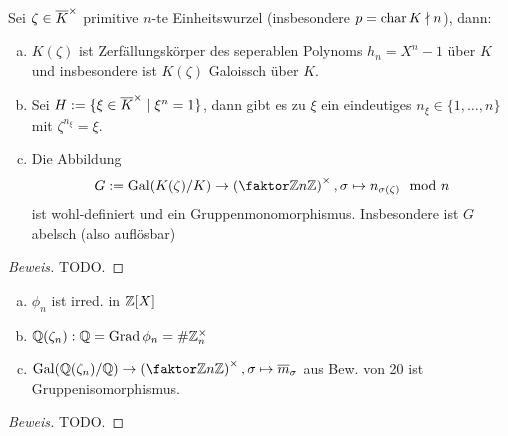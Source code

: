 \documentclass[a4paper]{report}
\begin{document}
\begin{prop}
  Sei $\zeta \in \overline K ^\times $ primitive $n$-te Einheitswurzel (insbesondere $p = \operatorname{char} K \nmid n$), dann:
  \begin{enumerate}[(a)]
    \item $K(\zeta)$ ist Zerfällungskörper des seperablen Polynoms $h_{n} = X^{n} - 1$ über $K$ und insbesondere ist $K(\zeta)$ Galoissch über $K$.
    \item Sei $H := \{\xi \in \overline K^\times \mid \xi^{n} = 1\}$, dann gibt es zu $\xi$ ein eindeutiges $n_{\xi} \in \{1, \ldots , n\}$ mit $\zeta^{n_{\xi}} = \xi$.
    \item Die Abbildung
          \[G:= \Gal(K(\zeta)/K) \to \l(\fak \Z{n\Z}\r)\en, \s \mps n_{\s(\zeta)} \mod n\]
          ist wohl-definiert und ein Gruppenmonomorphismus. Insbesondere ist $G$ abelsch (also auflösbar)
  \end{enumerate}
\begin{proof}[Beweis]TODO.

\end{proof}
\end{prop}
\begin{satz}\item
\begin{enumerate}[(a)]
  \item $\phi_{n}$ ist irred. in $\mathbb{Z}[X]$
  \item ${\mathbb{Q}(\zeta_{n}):\mathbb{Q}} = \operatorname{Grad} \phi_{n} = \# \mathbb{Z}_n^\times$
        \item $\Gal(\Q(\zeta_{n})/\Q) \to \l(\fak \Z{n\Z}\r)\en, \s \mps \bar m_{\s}$ aus Bew. von 20 ist Gruppenisomorphismus.
\end{enumerate}
\begin{proof}[Beweis]TODO.

\end{proof}
\end{satz}
\end{document}
